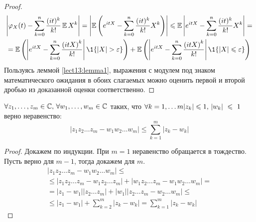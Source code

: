 \begin{proof}
\begin{multline*}
\left| \phi_X(t) - \sum_{k = 0}^n \frac{(it)^k}{k!}\E X^k\right| = \left|\E\left(e^{itX}- \sum_{k = 0}^n \frac{(it)^k}{k!} X^k\right)\right| \leqslant \E\left|e^{itX}- \sum_{k = 0}^n \frac{(it)^k}{k!} X^k\right| = \\
= \E\left(\left|e^{itX}- \sum_{k = 0}^n \frac{\left(itX\right)^k}{k!}\right|\1\{\left|X\right| > \eps\}\right) + \E\left(\left|e^{itX}- \sum_{k = 0}^n \frac{\left(itX\right)^k}{k!}\right|\1\{\left|X\right| \leqslant \eps\}\right)
\end{multline*}
Пользуясь леммой \ref{lect13:lemma1}, выражения с модулем под знаком математического ожидания в обоих слагаемых можно оценить первой и второй дробью из доказанной оценки соответственно.
\end{proof}
\begin{lemma}\label{lect13:lemma2}
$\forall z_1, \ldots, z_m \in \mathbb{C},\, \forall w_1, \ldots, w_m \in \mathbb{C}$
таких, что $\forall k = 1, \ldots m \\|z_k| \leqslant 1,\, |w_k|~\leqslant~1$
верно неравенство:
$$
|z_1z_2\ldots z_m - w_1w_2\ldots w_m| \leqslant \sum_{k=1}^m|z_k - w_k| 
$$
\end{lemma}
\begin{proof}
Докажем по индукции. При $m = 1$ неравенство обращается в тождество. Пусть верно для $m-1$, тогда докажем для $m$.
\begin{multline*}
|z_1z_2\ldots z_m - w_1w_2\ldots w_m| \leqslant 
\\ 
\leqslant|z_1z_2\ldots z_m - w_1z_2\ldots z_m| + |w_1z_2\ldots z_m - w_1w_2\ldots w_m| = 
\\
= |z_1 - w_1||z_2\ldots z_m| + |w_1||z_2\ldots z_m - w_2\ldots w_m|  \leqslant
\\
\leqslant |z_1 - w_1| + \sum_{k = 2}^m|z_k - w_k| = \sum_{k=1}^m|z_k - w_k|
\end{multline*}
\end{proof}
